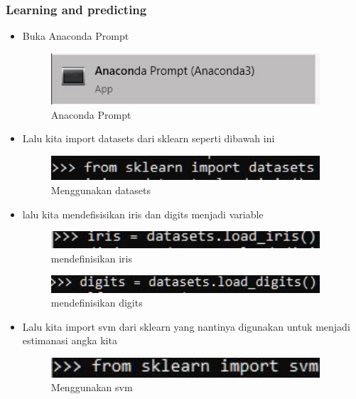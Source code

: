 \subsubsection{Learning and predicting}
\begin{itemize}
\item Buka Anaconda Prompt
\begin{figure}[H]
	\begin{center}
   	 \includegraphics[width=10cm]{figures/1174066/1/anaconda.png}
   	 \caption{Anaconda Prompt}	
	\end{center}
\end{figure}

\item Lalu kita import datasets dari sklearn seperti dibawah ini
\begin{figure}[H]
	\begin{center}
   	 \includegraphics[width=10cm]{figures/1174066/1/5.png}
   	 \caption{Menggunakan datasets}	
	\end{center}
\end{figure}

\item lalu kita mendefisisikan iris dan digits menjadi variable
\begin{figure}[H]
	\begin{center}
   	 \includegraphics[width=10cm]{figures/1174066/1/6.png}
   	 \caption{mendefinisikan iris}	
	\end{center}
\end{figure}
\begin{figure}[H]
	\begin{center}
   	 \includegraphics[width=10cm]{figures/1174066/1/7.png}
   	 \caption{mendefinisikan digits}	
	\end{center}
\end{figure}

\item Lalu kita import svm dari sklearn yang nantinya digunakan untuk menjadi estimanasi angka kita
\begin{figure}[H]
	\begin{center}
   	 \includegraphics[width=10cm]{figures/1174066/1/4.png}
   	 \caption{Menggunakan svm}	
	\end{center}
\end{figure}


\end{itemize}
